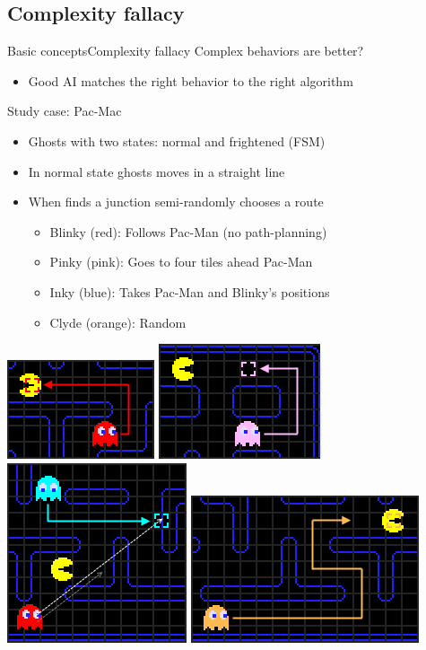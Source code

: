 \documentclass[10pt,compress]{beamer} %
\begin{document}
\subsection{Complexity fallacy}
\begin{frame}{Basic concepts}{Complexity fallacy}
	Complex behaviors are better?
  	\begin{itemize}
		\item Good AI matches the right behavior to the right algorithm
	\end{itemize}
	Study case: Pac-Mac
	\begin{itemize}
		\item Ghosts with two states: normal and frightened (FSM)
		\item In normal state ghosts moves in a straight line
		\item When finds a junction semi-randomly chooses a route
		\begin{itemize}
			\item Blinky (red): Follows Pac-Man (no path-planning)
			\item Pinky (pink): Goes to four tiles ahead Pac-Man
			\item Inky (blue): Takes Pac-Man and Blinky's positions
			\item Clyde (orange): Random
		\end{itemize}
	\end{itemize}
	\begin{center}
		\includegraphics[width=0.15\linewidth]{figs/red}\hspace{0.5cm}
		\includegraphics[width=0.15\linewidth]{figs/pink}\hspace{0.5cm}
		\includegraphics[width=0.15\linewidth]{figs/blue}\hspace{0.5cm}
		\includegraphics[width=0.15\linewidth]{figs/orange}
	\end{center}
\end{frame}
\end{document}
